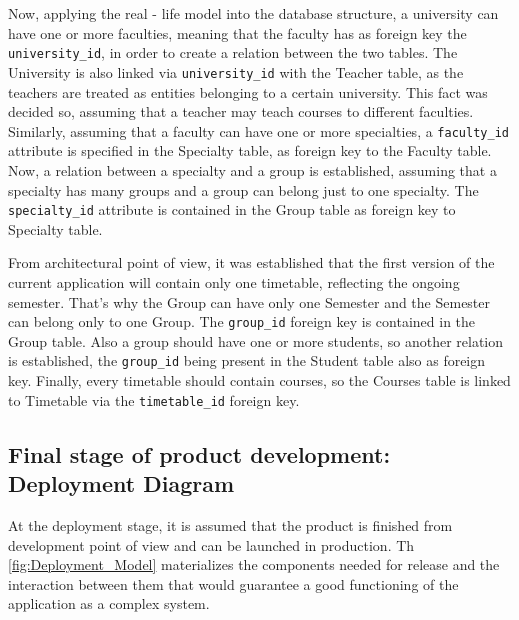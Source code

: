 \newpage
Now, applying the real - life model into the database structure, a university can have one or more faculties, meaning that the faculty has as foreign key the  \texttt{university\_id}, in order to create a relation between the two tables. The University is also linked via \texttt{university\_id} with the Teacher table, as the teachers are treated as entities belonging to a certain university. This fact was decided so, assuming that a teacher may teach courses to different faculties. Similarly, assuming that a faculty can have one or more specialties, a  \texttt{faculty\_id} attribute is specified in the Specialty table, as foreign key to the Faculty table. Now, a relation between a specialty and a group is established, assuming that a specialty has many groups and a group can belong just to one specialty. The  \texttt{specialty\_id} attribute is contained in the Group table as foreign key to Specialty table. 

From architectural point of view, it was established that the first version of the current application will contain only one timetable, reflecting the ongoing semester. That's why the Group can have only one Semester and the Semester can belong only to one Group. The  \texttt{group\_id} foreign key is contained in the Group table. Also a group should have one or more students, so another relation is established, the  \texttt{group\_id} being present in the Student table also as foreign key. Finally, every timetable should contain courses, so the Courses table is linked to Timetable via the  \texttt{timetable\_id} foreign key.

\subsection{Final stage of product development: Deployment Diagram}
At the deployment stage, it is assumed that the product is finished from development point of view and can be launched in production. Th \autoref{fig:Deployment_Model} materializes the components needed for release and the interaction between them that would guarantee a good functioning of the application as a complex system. 

